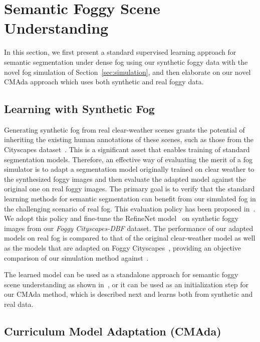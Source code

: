 \documentclass[twocolumn]{svjour3}          \smartqed  \usepackage{graphicx}
\begin{document}
\section{Semantic Foggy Scene Understanding}
\label{sec:semantic:learning} 

In this section, we first present a standard supervised learning approach for semantic segmentation under dense fog using our synthetic foggy data with the novel fog simulation of Section~\ref{sec:simulation}, and then elaborate on our novel CMAda approach which uses both synthetic and real foggy data. 

\subsection{Learning with Synthetic Fog}
\label{sec:learning:syn}
Generating synthetic fog from real clear-weather scenes grants the potential of inheriting the existing human annotations of these scenes, such as those from the Cityscapes dataset~\cite{Cityscapes}. This is a significant asset that enables training of standard segmentation models. Therefore, an effective way of evaluating the merit of a fog simulator is to adapt a segmentation model originally trained on clear weather to the synthesized foggy images and then evaluate the adapted model against the original one on real foggy images. The primary goal is to verify that the standard learning methods for semantic segmentation can benefit from our simulated fog in the challenging scenario of real fog. This evaluation policy has been proposed in~\cite{SFSU_synthetic}. We adopt this policy and fine-tune the RefineNet model~\cite{refinenet} on synthetic foggy images from our \emph{Foggy Cityscapes-DBF} dataset. The performance of our adapted models on real fog is compared to that of the original clear-weather model as well as the models that are adapted on Foggy Cityscapes~\cite{SFSU_synthetic}, providing an objective comparison of our simulation method against~\cite{SFSU_synthetic}.

The learned model can be used as a standalone approach for semantic foggy scene understanding as shown in~\cite{SFSU_synthetic}, or it can be used as an initialization step for our CMAda method, which is described next and learns both from synthetic and real data. 

\subsection{Curriculum Model Adaptation (CMAda)}
\end{document}
